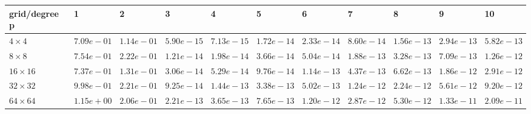 \begin{tabular}{lllllllllll}
\hline
 grid/degree p   & 1          & 2          & 3          & 4          & 5          & 6          & 7          & 8          & 9          & 10         \\
\hline
 $4 \times 4$    & $7.09e-01$ & $1.14e-01$ & $5.90e-15$ & $7.13e-15$ & $1.72e-14$ & $2.33e-14$ & $8.60e-14$ & $1.56e-13$ & $2.94e-13$ & $5.82e-13$ \\
 $8 \times 8$    & $7.54e-01$ & $2.22e-01$ & $1.21e-14$ & $1.98e-14$ & $3.66e-14$ & $5.04e-14$ & $1.88e-13$ & $3.28e-13$ & $7.09e-13$ & $1.26e-12$ \\
 $16 \times 16$  & $7.37e-01$ & $1.31e-01$ & $3.06e-14$ & $5.29e-14$ & $9.76e-14$ & $1.14e-13$ & $4.37e-13$ & $6.62e-13$ & $1.86e-12$ & $2.91e-12$ \\
 $32 \times 32$  & $9.98e-01$ & $2.21e-01$ & $9.25e-14$ & $1.44e-13$ & $3.38e-13$ & $5.02e-13$ & $1.24e-12$ & $2.24e-12$ & $5.61e-12$ & $9.20e-12$ \\
 $64 \times 64$  & $1.15e+00$ & $2.06e-01$ & $2.21e-13$ & $3.65e-13$ & $7.65e-13$ & $1.20e-12$ & $2.87e-12$ & $5.30e-12$ & $1.33e-11$ & $2.09e-11$ \\
\hline
\end{tabular}